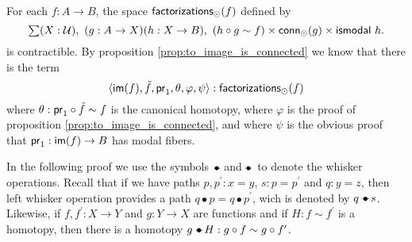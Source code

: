 \begin{thm}
For each $f:A\to B$, the space $\mathsf{factorizations}_{\odot}(f)$ defined by
\begin{equation*}
\sm{X:\type}(g:A\to X)(h:X\to B),\ (h\circ g\sim f)\times\mathsf{conn}_\modal(g)\times\ismodal\ h.
\end{equation*}
is contractible. By proposition \ref{prop:to_image_is_connected} we know that there is the term
\begin{equation*}
{\langle \ensuremath{\mathsf{im}}(f),\tilde{f},\ensuremath{\mathsf{pr}_{1}},\theta,\varphi,\psi\rangle}:\mathsf{factorizations}_{\odot}(f)
\end{equation*}
where $\theta:\mathsf{pr}_{1}\circ\tilde{f}\sim f$ is the canonical homotopy, where $\varphi$ is the proof of proposition
\ref{prop:to_image_is_connected}, and where $\psi$ is the obvious proof that $\mathsf{pr}_{1}:\mathsf{im}(f)\to B$ has modal fibers.
\end{thm}

In the following proof we use the symbols $\mathbin{-\!\!\!\!\bullet}$ and $\mathbin{\bullet\!\!\!\!-}$ to denote the whisker operations. Recall that if we have paths
$p,p^\prime:x= y$, $s:p= p^\prime$ and $q:y= z$, then left whisker operation provides a path $q\bullet p=
q\bullet p^\prime$, wich is denoted by $q\mathbin{-\!\!\!\!\bullet} s$. Likewise, if $f,f^\prime:X\to Y$ and $g:Y\to X$ are functions and if $H:f\sim
f^\prime$ is a homotopy, then there is a homotopy $g\mathbin{-\!\!\!\!\bullet} H:g\circ f\sim g\circ f^\prime$.


